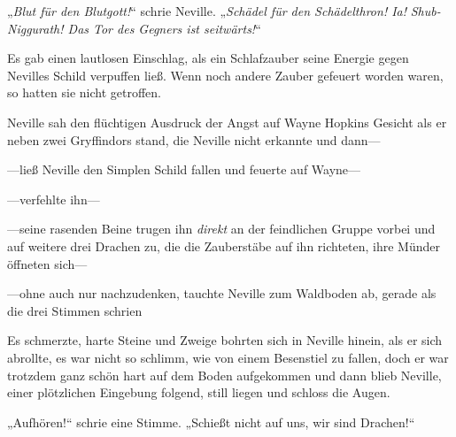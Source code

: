 „\emph{Blut für den Blutgott!}“ schrie Neville. „\emph{Schädel für den Schädelthron! Ia!} \emph{Shub-Niggurath! Das Tor des Gegners ist seitwärts!}“

Es gab einen lautlosen Einschlag, als ein Schlafzauber seine Energie gegen Nevilles Schild verpuffen ließ. Wenn noch andere Zauber gefeuert worden waren, so hatten sie nicht getroffen.

Neville sah den flüchtigen Ausdruck der Angst auf Wayne Hopkins Gesicht als er neben zwei Gryffindors stand, die Neville nicht erkannte und dann—

—ließ Neville den Simplen Schild fallen und feuerte auf Wayne—

—verfehlte ihn—

—seine rasenden Beine trugen ihn \emph{direkt} an der feindlichen Gruppe vorbei und auf weitere drei Drachen zu, die die Zauberstäbe auf ihn richteten, ihre Münder öffneten sich—

—ohne auch nur nachzudenken, tauchte Neville zum Waldboden ab, gerade als die drei Stimmen schrien 

Es schmerzte, harte Steine und Zweige bohrten sich in Neville hinein, als er sich abrollte, es war nicht so schlimm, wie von einem Besenstiel zu fallen, doch er war trotzdem ganz schön hart auf dem Boden aufgekommen und dann blieb Neville, einer plötzlichen Eingebung folgend, still liegen und schloss die Augen.

„Aufhören!“ schrie eine Stimme.
„Schießt nicht auf uns, wir sind Drachen!“


